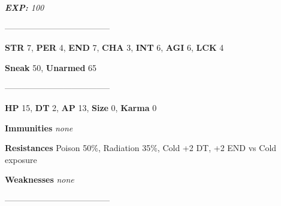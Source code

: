 \documentclass[11pt,a4paper,twocolumn]{book}
\begin{document}
	\emph{\textbf{EXP:} 100}
%	
%		
%	
%		

	--------------------------------------

\noindent
\textbf{STR} 7, \textbf{PER} 4, \textbf{END} 7, \textbf{CHA} 3, \textbf{INT} 6, \textbf{AGI} 6, \textbf{LCK} 4

\noindent
\textbf{Sneak} 50, \textbf{Unarmed} 65 %

--------------------------------------

\noindent
\textbf{HP} 15, \textbf{DT} 2, \textbf{AP} 13, \textbf{Size} 0, \textbf{Karma} 0


\noindent
\textbf{Immunities} \emph{none} %

\noindent
\textbf{Resistances} Poison 50\%, Radiation 35\%, Cold +2 DT, +2 END vs Cold exposure %

\noindent
\textbf{Weaknesses} \emph{none}%

--------------------------------------
	
\end{document}
